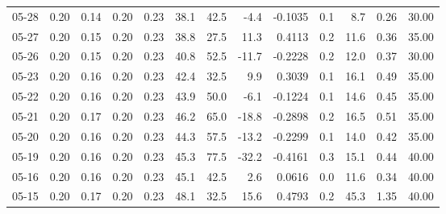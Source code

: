 \begin{threeparttable}
{\begin{tabular}{lrrrrrrrrrrrr}
  05-28 &          0.20 &          0.14 &          0.20 &        0.23 &                38.1 &                42.5 &       -4.4 &      -0.1035 &                 0.1 &              8.7 &            0.26 &                  30.00 \\
  05-27 &          0.20 &          0.15 &          0.20 &        0.23 &                38.8 &                27.5 &       11.3 &       0.4113 &                 0.2 &             11.6 &            0.36 &                  35.00 \\
  05-26 &          0.20 &          0.15 &          0.20 &        0.23 &                40.8 &                52.5 &      -11.7 &      -0.2228 &                 0.2 &             12.0 &            0.37 &                  30.00 \\
  05-23 &          0.20 &          0.16 &          0.20 &        0.23 &                42.4 &                32.5 &        9.9 &       0.3039 &                 0.1 &             16.1 &            0.49 &                  35.00 \\
  05-22 &          0.20 &          0.16 &          0.20 &        0.23 &                43.9 &                50.0 &       -6.1 &      -0.1224 &                 0.1 &             14.6 &            0.45 &                  35.00 \\
  05-21 &          0.20 &          0.17 &          0.20 &        0.23 &                46.2 &                65.0 &      -18.8 &      -0.2898 &                 0.2 &             16.5 &            0.51 &                  35.00 \\
  05-20 &          0.20 &          0.16 &          0.20 &        0.23 &                44.3 &                57.5 &      -13.2 &      -0.2299 &                 0.1 &             14.0 &            0.42 &                  35.00 \\
  05-19 &          0.20 &          0.16 &          0.20 &        0.23 &                45.3 &                77.5 &      -32.2 &      -0.4161 &                 0.3 &             15.1 &            0.44 &                  40.00 \\
  05-16 &          0.20 &          0.16 &          0.20 &        0.23 &                45.1 &                42.5 &        2.6 &       0.0616 &                 0.0 &             11.6 &            0.34 &                  40.00 \\
  05-15 &          0.20 &          0.17 &          0.20 &        0.23 &                48.1 &                32.5 &       15.6 &       0.4793 &                 0.2 &             45.3 &            1.35 &                  40.00 \\

\end{tabular}}
\end{threeparttable}

